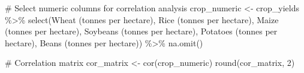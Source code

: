 \documentclass[
  letterpaper,
]{book}
\newenvironment{Shaded}{\begin{snugshade}}{\end{snugshade}}
\newcommand{\AttributeTok}[1]{\textcolor[rgb]{0.40,0.45,0.13}{#1}}
\newcommand{\CommentTok}[1]{\textcolor[rgb]{0.37,0.37,0.37}{#1}}
\newcommand{\DecValTok}[1]{\textcolor[rgb]{0.68,0.00,0.00}{#1}}
\newcommand{\FunctionTok}[1]{\textcolor[rgb]{0.28,0.35,0.67}{#1}}
\newcommand{\NormalTok}[1]{\textcolor[rgb]{0.00,0.23,0.31}{#1}}
\newcommand{\OtherTok}[1]{\textcolor[rgb]{0.00,0.23,0.31}{#1}}
\newcommand{\SpecialCharTok}[1]{\textcolor[rgb]{0.37,0.37,0.37}{#1}}
\newcommand{\StringTok}[1]{\textcolor[rgb]{0.13,0.47,0.30}{#1}}
\begin{document}
\begin{Shaded}
\begin{Highlighting}[]
\CommentTok{\# Select numeric columns for correlation analysis}
\NormalTok{crop\_numeric }\OtherTok{\textless{}{-}}\NormalTok{ crop\_yields }\SpecialCharTok{\%\textgreater{}\%}
  \FunctionTok{select}\NormalTok{(}\StringTok{\textasciigrave{}}\AttributeTok{Wheat (tonnes per hectare)}\StringTok{\textasciigrave{}}\NormalTok{, }\StringTok{\textasciigrave{}}\AttributeTok{Rice (tonnes per hectare)}\StringTok{\textasciigrave{}}\NormalTok{, }\StringTok{\textasciigrave{}}\AttributeTok{Maize (tonnes per hectare)}\StringTok{\textasciigrave{}}\NormalTok{, }\StringTok{\textasciigrave{}}\AttributeTok{Soybeans (tonnes per hectare)}\StringTok{\textasciigrave{}}\NormalTok{, }\StringTok{\textasciigrave{}}\AttributeTok{Potatoes (tonnes per hectare)}\StringTok{\textasciigrave{}}\NormalTok{, }\StringTok{\textasciigrave{}}\AttributeTok{Beans (tonnes per hectare)}\StringTok{\textasciigrave{}}\NormalTok{) }\SpecialCharTok{\%\textgreater{}\%}
  \FunctionTok{na.omit}\NormalTok{()}

\CommentTok{\# Correlation matrix}
\NormalTok{cor\_matrix }\OtherTok{\textless{}{-}} \FunctionTok{cor}\NormalTok{(crop\_numeric)}
\FunctionTok{round}\NormalTok{(cor\_matrix, }\DecValTok{2}\NormalTok{)}
\end{Highlighting}
\end{Shaded}
\end{document}
